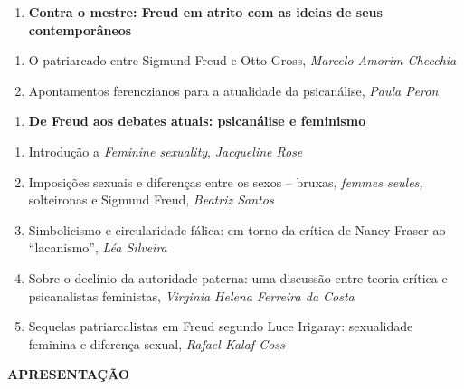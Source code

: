 \begin{enumerate}
\def\labelenumi{\Roman{enumi}.}
\item
  \textbf{Contra o mestre: Freud em atrito com as ideias de seus
  contemporâneos}
\end{enumerate}

\begin{enumerate}
\def\labelenumi{\arabic{enumi}.}
\item
  O patriarcado entre Sigmund Freud e Otto Gross, \emph{Marcelo Amorim
  Checchia}
\item
  Apontamentos ferenczianos para a atualidade da psicanálise,
  \emph{Paula Peron}
\end{enumerate}

\begin{enumerate}
\def\labelenumi{\Roman{enumi}.}
\item
  \textbf{De Freud aos debates atuais: psicanálise e feminismo}
\end{enumerate}

\begin{enumerate}
\def\labelenumi{\arabic{enumi}.}
\item
  Introdução a \emph{Feminine sexuality}, \emph{Jacqueline Rose}
\item
  Imposições sexuais e diferenças entre os sexos -- bruxas, \emph{femmes
  seules,} solteironas e Sigmund Freud, \emph{Beatriz Santos}
\item
  Simbolicismo e circularidade fálica: em torno da crítica de Nancy
  Fraser ao ``lacanismo'', \emph{Léa Silveira}
\item
  Sobre o declínio da autoridade paterna: uma discussão entre teoria
  crítica e psicanalistas feministas, \emph{Virginia Helena Ferreira da
  Costa}
\item
  Sequelas patriarcalistas em Freud segundo Luce Irigaray: sexualidade
  feminina e diferença sexual, \emph{Rafael Kalaf Coss}
\end{enumerate}

\textbf{APRESENTAÇÃO}

